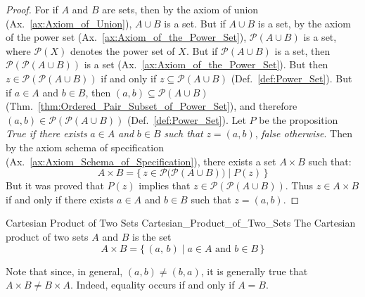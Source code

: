         \begin{proof}
            For if $A$ and $B$ are sets, then by the axiom of union
            (Ax.~\ref{ax:Axiom_of_Union}), $A\cup{B}$ is a set. But if
            $A\cup{B}$ is a set, by the axiom of the power set
            (Ax.~\ref{ax:Axiom_of_the_Power_Set}), $\mathcal{P}(A\cup{B})$ is
            a set, where $\mathcal{P}(X)$ denotes the power set of $X$. But if
            $\mathcal{P}(A\cup{B})$ is a set, then
            $\mathcal{P}(\mathcal{P}(A\cup{B}))$ is a set
            (Ax.~\ref{ax:Axiom_of_the_Power_Set}). But then
            $z\in\mathcal{P}(\mathcal{P}(A\cup{B}))$ if and only if
            $z\subseteq\mathcal{P}(A\cup{B})$ (Def.~\ref{def:Power_Set}).
            But if $a\in{A}$ and $b\in{B}$, then
            $(a,b)\subseteq\mathcal{P}(A\cup{B})$
            (Thm.~\ref{thm:Ordered_Pair_Subset_of_Power_Set}), and therefore
            $(a,b)\in\mathcal{P}(\mathcal{P}(A\cup{B}))$
            (Def.~\ref{def:Power_Set}). Let $P$ be the proposition
            \textit{True if there exists} $a\in{A}$ \textit{and}
            $b\in{B}$ \textit{such that} $z=(a,b)$, \textit{false otherwise}.
            Then by the axiom schema of specification
            (Ax.~\ref{ax:Axiom_Schema_of_Specification}), there exists a
            set $A\times{B}$ such that:
            \begin{equation}
                A\times{B}=
                \{\,z\in\mathcal{P}\big(\mathcal{P}(A\cup{B})\big)\;|\;
                    P(z)\,\}
            \end{equation}
            But it was proved that $P(z)$ implies that
            $z\in\mathcal{P}(\mathcal{P}(A\cup{B}))$. Thus $z\in{A}\times{B}$
            if and only if there exists $a\in{A}$ and $b\in{B}$
            such that $z=(a,b)$.
        \end{proof}
        \begin{fdefinition}{Cartesian Product of Two Sets}
                           {Cartesian_Product_of_Two_Sets}
            The Cartesian product of two sets $A$ and $B$ is the set
            \begin{equation}
                A\times{B}
                =\{\,(a,\,b)\;|\;a\in{A}\textrm{ and }b\in{B}\,\}
            \end{equation}
        \end{fdefinition}
        Note that since, in general, $(a,b)\ne(b,a)$, it is generally true that
        $A\times{B}\ne{B}\times{A}$. Indeed, equality occurs if and only if
        $A=B$.
